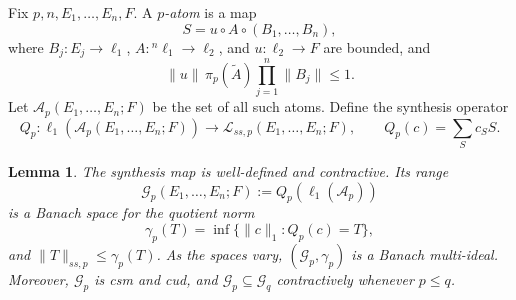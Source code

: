 \documentclass[11pt]{amsart}
\newtheorem{lemma}[theorem]{Lemma}
\newcommand{\Lcal}{\mathcal L}
\newcommand{\Gcal}{\mathcal G}
\begin{document}
Fix $p,n,E_1,\ldots,E_n,F$.  A \emph{$p$-atom} is a map
\begin{equation}\label{eq:atom}
 S=u\circ A\circ(B_1,\ldots,B_n),
\end{equation}
where $B_j:E_j\to\ell_1$, $A:{}^n\ell_1\to\ell_2$, and
$u:\ell_2\to F$ are bounded, and
\begin{equation}\label{eq:cost}
 \|u\|\,\pi_p(\widetilde A)\prod_{j=1}^n\|B_j\|\leq1.
\end{equation}
Let $\mathcal A_p(E_1,\ldots,E_n;F)$ be the set of all such atoms.  Define the
synthesis operator
\[
 Q_p:\ell_1(\mathcal A_p(E_1,\ldots,E_n;F))
       \longrightarrow \Lcal_{ss,p}(E_1,\ldots,E_n;F),
 \qquad Q_p(c)=\sum_{S}c_S S.
\]

\begin{lemma}\label{lem:atomic}
The synthesis map is well-defined and contractive.  Its range
\[
 \Gcal_p(E_1,\ldots,E_n;F):=Q_p(\ell_1(\mathcal A_p))
\]
is a Banach space for the quotient norm
\[
 \gamma_p(T)=\inf\{\|c\|_1:Q_p(c)=T\},
\]
and $\|T\|_{ss,p}\leq\gamma_p(T)$.  As the spaces vary,
$(\Gcal_p,\gamma_p)$ is a Banach multi-ideal.  Moreover, $\Gcal_p$ is csm and
cud, and $\Gcal_p\subseteq\Gcal_q$ contractively whenever $p\leq q$.
\end{lemma}
\end{document}
